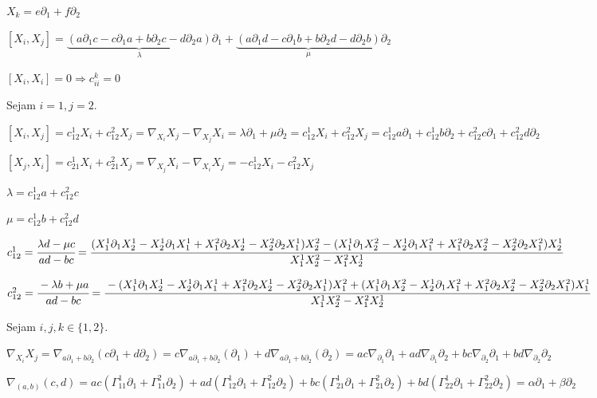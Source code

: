 \documentclass[10pt,a4paper]{article}
\begin{document}
		$X_k = e \partial_1 + f \partial_2$

		$[X_i, X_j] = \underbrace{(a \partial_1 c - c \partial_1 a + b \partial_2 c - d \partial_2 a)}_\lambda \partial_1 + \underbrace{(a \partial_1 d - c \partial_1 b + b \partial_2 d - d \partial_2 b)}_\mu \partial_2$

		$[X_i, X_i] = 0 \Rightarrow c_{ii}^k = 0$

		\vspace{3mm}

		Sejam $i = 1, j = 2$.

		$[X_i, X_j] = c_{12}^1 X_i + c_{12}^2 X_j = \nabla_{X_i} X_j - \nabla_{X_j} X_i = \lambda\partial_1 + \mu\partial_2 = c_{12}^1X_i + c_{12}^2X_j = c_{12}^1a \partial_1 + c_{12}^1b \partial_2 + c_{12}^2c \partial_1 + c_{12}^2d \partial_2$

		$[X_j, X_i] = c_{21}^1 X_i + c_{21}^2 X_j = \nabla_{X_j} X_i - \nabla_{X_i} X_j = - c_{12}^1 X_i - c_{12}^2 X_j$

		$\lambda = c_{12}^1a + c_{12}^2c$

		$\mu = c_{12}^1b + c_{12}^2d$

		$c_{12}^1 = \cfrac{\lambda d - \mu c}{a d - b c} = \cfrac{(X_1^1 \partial_1 X_2^1 - X_2^1 \partial_1 X_1^1 + X_1^2 \partial_2 X_2^1 - X_2^2 \partial_2 X_1^1) X_2^2 - (X_1^1 \partial_1 X_2^2 - X_2^1 \partial_1 X_1^2 + X_1^2 \partial_2 X_2^2 - X_2^2 \partial_2 X_1^2) X_2^1}{X_1^1 X_2^2 - X_1^2 X_2^1}$

		$c_{12}^2 = \cfrac{- \lambda b + \mu a}{a d - b c} = \cfrac{- (X_1^1 \partial_1 X_2^1 - X_2^1 \partial_1 X_1^1 + X_1^2 \partial_2 X_2^1 - X_2^2 \partial_2 X_1^1) X_1^2 + (X_1^1 \partial_1 X_2^2 - X_2^1 \partial_1 X_1^2 + X_1^2 \partial_2 X_2^2 - X_2^2 \partial_2 X_1^2) X_1^1}{X_1^1 X_2^2 - X_1^2 X_2^1}$

		\vspace{3mm}

		Sejam $i,j,k \in \{1,2\}$.

		$\nabla_{X_i} X_j = \nabla_{a \partial_1 + b \partial_2} (c \partial_1 + d \partial_2)  = c \nabla_{a \partial_1 + b \partial_2} (\partial_1) + d \nabla_{a \partial_1 + b \partial_2} (\partial_2) = ac \nabla_{ \partial_1} \partial_1 + ad \nabla_{\partial_1} \partial_2 + bc \nabla_{\partial_2} \partial_1 + bd \nabla_{ \partial_2} \partial_2$

		$\nabla_{(a,b)} (c,d) = ac(\Gamma_{11}^1 \partial_1 + \Gamma_{11}^2 \partial_2) + ad(\Gamma_{12}^1 \partial_1 + \Gamma_{12}^2 \partial_2) + bc(\Gamma_{21}^1 \partial_1 + \Gamma_{21}^2 \partial_2) + bd(\Gamma_{22}^1 \partial_1 + \Gamma_{22}^2 \partial_2) = \alpha \partial_1 + \beta \partial_2$
\end{document}
